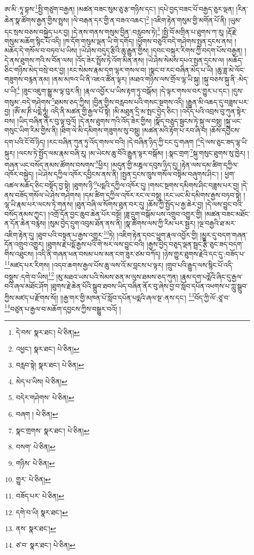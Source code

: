 ཨ་མི་:ཏཱ་བྷས་\footnote{དེ་བས་  སྣར་ཐང་།  པེ་ཅིན། }སྤྱི་གཙུག་བརྒྱན། །མཚན་བཟང་སུམ་ཅུ་རྩ་གཉིས་དང་། །དཔེ་བྱད་བཟང་པོ་བརྒྱད་ཅུར་ལྡན། །རིན་ཆེན་སྣ་ཚོགས་རྒྱན་གྱིས་སྤྲས། །ལེ་བརྒན་དར་གྱི་ན་བཟའ་འཆང་།\footnote{འཕྱང་།  སྣར་ཐང་།  པེ་ཅིན། } །འཇིག་རྟེན་གསུམ་གྱི་མགོན་པོ་ནི། །ཡུམ་དང་སྲས་བཅས་བསྐྱེད་པར་བྱ། །དེ་ནས་གནས་གསུམ་བྱིན་:བརླབས་ཏེ།\footnote{བརླབ་སྟེ།  སྣར་ཐང་།  པེ་ཅིན། } །སྤྱི་བོ་མགྲིན་པ་ཐུགས་ཀ་རུ། །རྡོ་རྗེ་གསུམ་མཆོག་སྙིང་པོ་འདི། །ཁ་དོག་གསུམ་ལྡན་ཡི་གེ་དགོད། །ཕྱོགས་བཅུའི་བདེ་གཤེགས་སྤྱན་དྲངས་ནས། །མཆོད་དེ་གསོལ་བ་བཏབ་པ་ཡིས། །ཡེ་ཤེས་བདུད་རྩིའི་ཆུ་རྒྱུན་གྱིས། །དབང་བསྐུར་རིགས་ཀྱི་བདག་པོས་བརྒྱན། །དེ་ནས་ཐུགས་ཀའི་ས་བོན་ལས། །འོད་ཟེར་སྤྲོས་ཏེ་འོག་མིན་ནས། །ཡེ་ཤེས་སེམས་དཔའ་སྤྱན་དྲངས་ལ། །མཆོད་ཅིང་གཉིས་མེད་བསྲེ་བར་བྱ། །རང་སེམས་རྣམ་དག་ལྷར་གསལ་བ། །སྣང་བ་རང་བཞིན་མེད་པ་ཡི། །ཆུ་ཟླ་མེ་ལོང་གཟུགས་བརྙན་ནམ། །ནམ་མཁའ་ཡི་ནི་འཇའ་ཚོན་ལྟར། །མཐའ་གཉིས་ལས་གྲོལ་ལྷ་ཡི་སྐུ། །སྐུ་བཅས་སྐུ་ནི་:མེད་པ་ཡི།\footnote{མེད་པ་ཡིས།  པེ་ཅིན། } །ཟུང་འཇུག་སྒྱུ་མ་ལྟ་བུར་ནི། །རྣལ་འབྱོར་པ་ཡིས་རྟག་ཏུ་བསྒོམ། །དེ་ལྟར་གསལ་བར་གྱུར་པ་དང་། །དུས་གསུམ་:བདེ་གཤེགས་\footnote{བདེར་གཤེགས་  པེ་ཅིན། }ཐམས་ཅད་ཀྱིས། །བྱིན་གྱིས་བརླབས་པའི་གསང་སྔགས་འདི། །རྒྱུན་མི་འཆད་དུ་བཟླས་པར་བྱ། །ཨོཾ་མ་ཎི་པདྨེ་ཧཱུཾ། འདི་ནི་མཚན་གྱི་རྒྱལ་པོ་སྟེ། །མི་མཐུན་དྲི་མ་སྤང་བྱེད་ཅིང་། །འདོད་པའི་འབྲས་བུ་ཀུན་སྟེར་བས། །ཡིད་བཞིན་ནོར་བུ་ལྟ་བུའོ། །དེ་ནས་ཐུགས་ཀའི་འོད་ཟེར་གྱིས། །སྣོད་བཅུད་སྦྱངས་ཏེ་སྐུ་ལ་བསྡུ། །སྐུ་ཡང་གསུང་ཡིག་རིམ་གྱིས་ནི། །ཐིག་ལེ་མི་དམིགས་གཟུགས་སུ་བསྡུ། །མཚན་མའི་རྟོག་པ་རབ་ཞི་བ། །ཆོས་དབྱིངས་དག་པའི་ངོ་བོ་ཉིད། །རང་བཞིན་ཀུན་ཏུ་འོད་གསལ་བའི། །དེ་བཞིན་ཉིད་ཀྱི་ངང་དུ་གཞག །\footnote{བཞག །  པེ་ཅིན། }དེ་ལས་ཅུང་ཟད་ལྷ་ཡི་སྐུར། །ལངས་ཏེ་སྤྱོད་ལམ་རྣམ་བཞི་རུ། །མ་ཡེངས་ཆུ་བོའི་རྒྱུན་ལྟར་བསྒོམ། །:སྣང་གྲག་\footnote{སྣང་གྲགས་  སྣར་ཐང་།  པེ་ཅིན། }སྐུ་གསུང་ཐུགས་སུ་ཁྱེར། །གཞན་ཡང་བསོད་ནམས་ཚོགས་བསགས་\footnote{བསག་  པེ་ཅིན། }ཕྱིར། །མདུན་གྱི་མཎྜལ་དབུས་ཉིད་དུ། །རྟེན་ལས་དམ་ཚིག་དཀྱིལ་འཁོར་བསྐྱེད། །ཡེ་ཤེས་དཀྱིལ་འཁོར་དབྱིངས་ནས་ནི། །སྤྱན་དྲངས་ཁྲུས་གསོལ་བསྟིམ་བཞུགས་ཤིང་། །
ཕྱག་འཚལ་མཆོད་ཅིང་བསྟོད་བྱ་སྟེ། །ཐུགས་ཉི་\footnote{གཉིས་  པེ་ཅིན། }པདྨའི་དཀྱིལ་འཁོར་དུ། །གསང་སྔགས་དམིགས་ཤིང་བཟླས་པར་བྱ། །དེ་ནས་བཟོད་གསོལ་ཡེ་ཤེས་གཤེགས། །དམ་ཚིག་དཀྱིལ་འཁོར་རང་ལ་བསྡུ། །རང་ཡང་མི་དམིགས་རྒྱས་བཏབ་སྟེ། །ལྷ་ཡི་རྣམ་པར་ལངས་ཏེ་གནས། །ཐུན་བཞི་ལ་སོགས་ཐུན་བར་དུ། །ཆོས་ཀྱི་སྤྱོད་པ་རྒྱ་ཆེར་བྱ། །དེ་ལས་བྱུང་བའི་བསོད་ནམས་ཀྱང་། །འགྲོ་དོན་བྱང་ཆུབ་ཆེན་པོར་བསྔོ། །ཟླ་དྲུག་བསྒོམ་པས་འགྲུབ་འགྱུར་གྱི། །མཚན་བཟང་མཐོང་ན་དོན་ཆེན་བརྙེས། །སུམ་བྱེད་དྲུག་འབུམ་ཐོན་ནས་ནི། །སྣ་ཚོགས་ལས་ཀྱི་རིམ་པར་སྦྱར། །ལྔ་བརྒྱའི་ཐ་མར་འཇིག་རྟེན་དུ། །ཐུབ་པའི་བསྟན་པ་རྒྱས་འགྱུར་\footnote{གྱུར་  པེ་ཅིན། }ཏེ། །འཇིག་རྟེན་དབང་ཕྱུག་རྣལ་འབྱོར་གྱི། །མྱུར་དུ་བདག་གཞན་དོན་འགྲུབ་འགྱུར། །ཐུགས་རྗེ་པདྨོ་རྒྱས་པའི་གེ་སར་ལས་བྱུང་བའི། །རྒྱས་བྱེད་བཅུད་ལྡན་སྦྲང་རྩི་ཅུང་ཟད་བདག་གིས་འཐུངས། །འདི་ནི་གཞན་ཕན་བསམ་པས་མན་ངག་ཟུར་ཙམ་བཀོད། །ཉེས་གྱུར་ཐུགས་རྗེའི་དང་དུ་:བཟོད་པ་\footnote{བཟོད་པར་  པེ་ཅིན། }མཛད་པར་རིགས། །འདབ་ཆགས་རྒྱལ་པོས་ཆུ་ལས་འོ་མ་བླངས་པ་ལྟར། །གྲུབ་པའི་རྒྱུད་ལས་སྙིང་པོ་འདི་བསྡུས་:དགེ་བ་ཡིས།\footnote{དགེ་བ་ཡི།  སྣར་ཐང་། } །མུ་མཐའ་ཡས་པའི་སེམས་ཅན་མ་ལུས་ཐམས་ཅད་ཀུན། །རྣམ་དག་པདྨོའི་ཞིང་དུ་རྒྱལ་བའི་ཞལ་མཐོང་ཤོག །ཐུགས་རྗེ་ཆེན་པོའི་སྒྲུབ་ཐབས་ཡིད་བཞིན་ནོར་བུ་ཞེས་བྱ་བ་སློབ་དཔོན་འཕགས་པ་ཀླུ་སྒྲུབ་ཀྱིས་མཛད་པ་རྫོགས་སོ།། །།རྒྱ་གར་གྱི་མཁན་པོ་སློབ་དཔོན་པདྨའི་ཞལ་སྔ་:ནས་དང་། \footnote{ནས་  སྣར་ཐང་། }བོད་ཀྱི་ལོ་:ཙཱ་བ་\footnote{ཙ་བ་  སྣར་ཐང་།  པེ་ཅིན། }བཙུན་པ་རྒྱལ་བ་མཆོག་དབྱངས་ཀྱིས་བསྒྱུར་བའོ། ། 